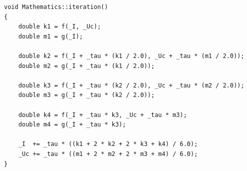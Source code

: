 \begin{lstlisting}[caption=Решение системы уравнений методом Рунге-Кутта]
void Mathematics::iteration()
{
    double k1 = f(_I, _Uc);
    double m1 = g(_I);

    double k2 = f(_I + _tau * (k1 / 2.0), _Uc + _tau * (m1 / 2.0));
    double m2 = g(_I + _tau * (k1 / 2.0));

    double k3 = f(_I + _tau * (k2 / 2.0), _Uc + _tau * (m2 / 2.0));
    double m3 = g(_I + _tau * (k2 / 2.0));

    double k4 = f(_I + _tau * k3, _Uc + _tau * m3);
    double m4 = g(_I + _tau * k3);

    _I  += _tau * ((k1 + 2 * k2 + 2 * k3 + k4) / 6.0);
    _Uc += _tau * ((m1 + 2 * m2 + 2 * m3 + m4) / 6.0);
}
\end{lstlisting}


